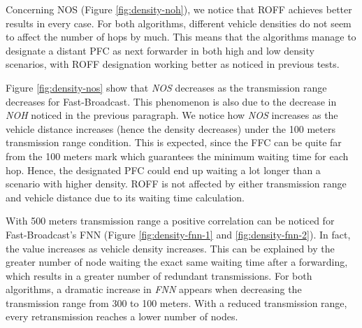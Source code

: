 		
		Concerning NOS (Figure \ref{fig:density-noh}), we notice that ROFF achieves better results in every case. For both algorithms, different vehicle densities do not seem to affect the number of hops by much. This means that the algorithms manage to designate a distant PFC as next forwarder in both high and low density scenarios, with ROFF designation working better as noticed in previous tests.
		
		
		Figure \ref{fig:density-nos} show that \textit{NOS} decreases as the transmission range decreases for Fast-Broadcast. This phenomenon is also due to the decrease in \textit{NOH} noticed in the previous paragraph. We notice how \textit{NOS} increases as the vehicle distance increases (hence the density decreases) under the 100 meters transmission range condition. This is expected, since the FFC can be quite far from the 100 meters mark which guarantees the minimum waiting time for each hop. Hence, the designated PFC could end up waiting a lot longer than a scenario with higher density.
		ROFF is not affected by either transmission range and vehicle distance due to its waiting time calculation.
		
		
		With 500 meters transmission range a positive correlation can be noticed for Fast-Broadcast's FNN (Figure \ref{fig:density-fnn-1} and \ref{fig:density-fnn-2}). In fact, the value increases as vehicle density increases. This can be explained by the greater number of node waiting the exact same waiting time after a forwarding, which results in a greater number of redundant transmissions. 
		For both algorithms, a dramatic increase in \textit{FNN} appears when decreasing the transmission range from 300 to 100 meters. With a reduced transmission range, every retransmission reaches a lower number of nodes.
		
	
